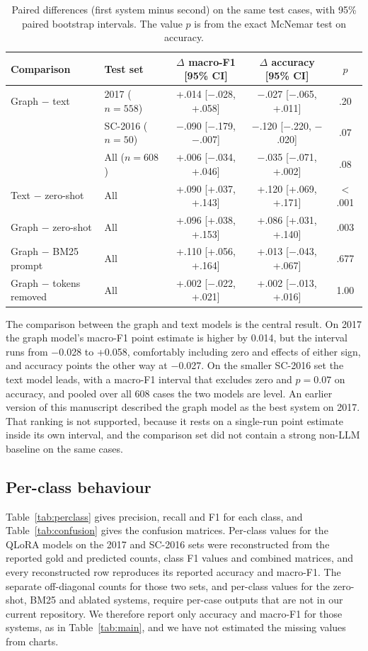 \documentclass[11pt,a4paper]{article}
\begin{document}
\begin{table}[t]\centering\small
\setlength{\tabcolsep}{4pt}
\caption{Paired differences (first system minus second) on the same test cases, with 95\% paired bootstrap intervals. The value $p$ is from the exact McNemar test on accuracy.}\label{tab:paired}
\begin{tabular}{@{}llccc@{}}\toprule
Comparison & Test set & $\Delta$ macro-F1 [95\% CI] & $\Delta$ accuracy [95\% CI] & $p$\\\midrule
Graph $-$ text & 2017 ($n=558$) & +.014 [$-$.028, +.058] & $-$.027 [$-$.065, +.011] & .20\\
& SC-2016 ($n=50$) & $-$.090 [$-$.179, $-$.007] & $-$.120 [$-$.220, $-$.020] & .07\\
& All ($n=608$) & +.006 [$-$.034, +.046] & $-$.035 [$-$.071, +.002] & .08\\
Text $-$ zero-shot & All & +.090 [+.037, +.143] & +.120 [+.069, +.171] & $<$.001\\
Graph $-$ zero-shot & All & +.096 [+.038, +.153] & +.086 [+.031, +.140] & .003\\
Graph $-$ BM25 prompt & All & +.110 [+.056, +.164] & +.013 [$-$.043, +.067] & .677\\
Graph $-$ tokens removed & All & +.002 [$-$.022, +.021] & +.002 [$-$.013, +.016] & 1.00\\\bottomrule
\end{tabular}\end{table}

The comparison between the graph and text models is the central result. On 2017 the graph model's macro-F1 point estimate is higher by 0.014, but the interval runs from $-$0.028 to +0.058, comfortably including zero and effects of either sign, and accuracy points the other way at $-$0.027. On the smaller SC-2016 set the text model leads, with a macro-F1 interval that excludes zero and $p=0.07$ on accuracy, and pooled over all 608 cases the two models are level. An earlier version of this manuscript described the graph model as the best system on 2017. That ranking is not supported, because it rests on a single-run point estimate inside its own interval, and the comparison set did not contain a strong non-LLM baseline on the same cases.

\subsection{Per-class behaviour}
Table~\ref{tab:perclass} gives precision, recall and F1 for each class, and Table~\ref{tab:confusion} gives the confusion matrices. Per-class values for the QLoRA models on the 2017 and SC-2016 sets were reconstructed from the reported gold and predicted counts, class F1 values and combined matrices, and every reconstructed row reproduces its reported accuracy and macro-F1. The separate off-diagonal counts for those two sets, and per-class values for the zero-shot, BM25 and ablated systems, require per-case outputs that are not in our current repository. We therefore report only accuracy and macro-F1 for those systems, as in Table~\ref{tab:main}, and we have not estimated the missing values from charts.
\end{document}
